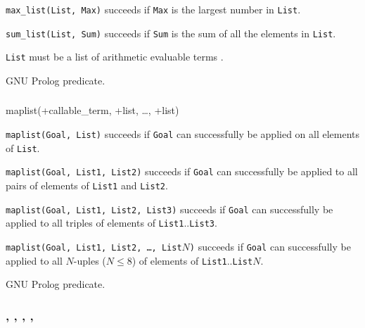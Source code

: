 \texttt{max\_list(List, Max)} succeeds if \texttt{Max} is the
largest number in \texttt{List}.

\texttt{sum\_list(List, Sum)} succeeds if \texttt{Sum} is the
sum of all the elements in \texttt{List}.

\texttt{List} must be a list of arithmetic evaluable terms
.

\PlErrorsNone

\Portability

GNU Prolog predicate.

\subsubsection{}

\begin{TemplatesOneCol}
maplist(+callable\_term, +list, \ldots, +list)

\end{TemplatesOneCol}

\Description

\texttt{maplist(Goal, List)} succeeds if \texttt{Goal} can successfully be
applied on all elements of \texttt{List}.

\texttt{maplist(Goal, List1, List2)} succeeds if \texttt{Goal} can successfully be
applied to all pairs of elements of \texttt{List1} and \texttt{List2}.

\texttt{maplist(Goal, List1, List2, List3)} succeeds if \texttt{Goal} can successfully be
applied to all triples of elements of \texttt{List1}..\texttt{List3}.

\texttt{maplist(Goal, List1, List2, \ldots, List$N$)} succeeds if \texttt{Goal} can successfully be
applied to all $N$-uples ($N \leq 8$) of elements of \texttt{List1}..\texttt{List$N$}.

\begin{PlErrors}


\end{PlErrors}

\Portability

GNU Prolog predicate.

\subsubsection{,\label{sort/2}
               ,
               ,
               ,
               }


